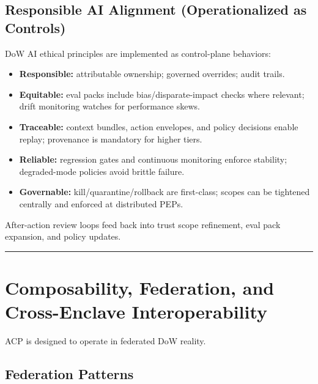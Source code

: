 \documentclass[11pt]{article}
\begin{document}
\hypertarget{responsible-ai-alignment-operationalized-as-controls}{%
\subsection{Responsible AI Alignment (Operationalized as Controls)}\label{responsible-ai-alignment-operationalized-as-controls}}

DoW AI ethical principles are implemented as control-plane behaviors:

\begin{itemize}
\tightlist
\item
  \textbf{Responsible:} attributable ownership; governed overrides;
  audit trails.
\item
  \textbf{Equitable:} eval packs include bias/disparate-impact checks
  where relevant; drift monitoring watches for performance skews.
\item
  \textbf{Traceable:} context bundles, action envelopes, and policy
  decisions enable replay; provenance is mandatory for higher tiers.
\item
  \textbf{Reliable:} regression gates and continuous monitoring enforce
  stability; degraded-mode policies avoid brittle failure.
\item
  \textbf{Governable:} kill/quarantine/rollback are first-class; scopes
  can be tightened centrally and enforced at distributed PEPs.
\end{itemize}

After-action review loops feed back into trust scope refinement, eval
pack expansion, and policy updates.

\vspace{2pt}\begin{center}\rule{0.62\linewidth}{0.6pt}\end{center}\vspace{2pt}

\hypertarget{composability-federation-and-cross-enclave-interoperability}{%
\section{Composability, Federation, and Cross-Enclave Interoperability}\label{composability-federation-and-cross-enclave-interoperability}}

ACP is designed to operate in federated DoW reality.

\hypertarget{federation-patterns}{%
\subsection{Federation Patterns}\label{federation-patterns}}
\end{document}
